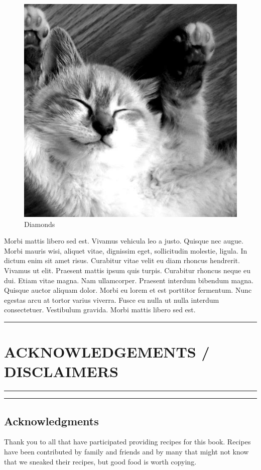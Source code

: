 \documentclass[
]{book}
\begin{document}
\begin{figure}  
 \begin{center}
    \includegraphics[width=.2\textwidth]{"images/500.jpg"}
  \caption{Diamonds} 
\end{center}
\end{figure}

Morbi mattis libero sed est. Vivamus vehicula leo a justo. Quisque nec augue. Morbi mauris wisi, aliquet vitae, dignissim eget, sollicitudin molestie, ligula. In dictum enim sit amet risus. Curabitur vitae velit eu diam rhoncus hendrerit. Vivamus ut elit. Praesent mattis ipsum quis turpis. Curabitur rhoncus neque eu dui. Etiam vitae magna. Nam ullamcorper. Praesent interdum bibendum magna. Quisque auctor aliquam dolor. Morbi eu lorem et est porttitor fermentum. Nunc egestas arcu at tortor varius viverra. Fusce eu nulla ut nulla interdum consectetuer. Vestibulum gravida. Morbi mattis libero sed est.

\begin{center}\rule{0.5\linewidth}{0.5pt}\end{center}

\hypertarget{acknowledgements-disclaimers}{%
\chapter*{ACKNOWLEDGEMENTS / DISCLAIMERS}\label{acknowledgements-disclaimers}}


\begin{center}\rule{0.5\linewidth}{0.5pt}\end{center}

\begin{center}\rule{0.5\linewidth}{0.5pt}\end{center}

\hypertarget{acknowledgments}{%
\section*{Acknowledgments}\label{acknowledgments}}


Thank you to all that have participated providing recipes for this book. Recipes have been contributed by family and friends and by many that might not know that we sneaked their recipes, but good food is worth copying.
\end{document}
